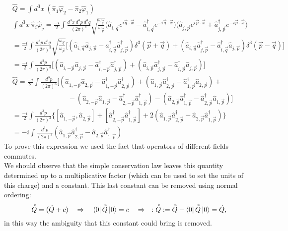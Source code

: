 \begin{align*}
   &\hat Q=\int d^3x\ (\hat\pi_1\hat\varphi_2-\hat\pi_2\hat\varphi_1)\\
   &\int d^3x\ \hat\pi_i\hat\varphi_j=\frac{-i}{2}\int\frac{d^3x\ d^3p\ d^3q}{(2\pi)^6}\sqrt{\frac{\omega_{\vec{q}}}{\omega_{\vec{p}}}} \bigg(\hat{a}_{i,\vec{q}}e^{i\vec q\cdot \vec x}-\hat{a}_{i,\vec{q}}^\dagger e^{-i\vec q\cdot \vec x}\bigg)\bigg(\hat{a}_{j,\vec{p}}e^{i\vec p\cdot \vec x}+\hat{a}_{j,\vec{p}}^\dagger e^{-i\vec p\cdot \vec x}\bigg)\\&=\frac{-i}{2}\int\frac{d^3p\ d^3q}{(2\pi)^3}\sqrt{\frac{\omega_{\vec{q}}}{\omega_{\vec{p}}}}\bigg[(\hat{a}_{i,\vec{q}}\hat{a}_{j,\vec{p}}-\hat{a}_{i,\vec{q}}^\dagger\hat{a}_{j,\vec{p}}^\dagger)\delta^3(\vec p+\vec q)+(\hat{a}_{i,\vec{q}}\hat{a}_{j,\vec{p}}^\dagger-\hat{a}_{i,\vec{q}}^\dagger\hat{a}_{j,\vec{p}}) \delta^3(\vec p-\vec q) \bigg]\\&=\frac{-i}{2}\int\frac{d^3p}{(2\pi)^3}\bigg[(\hat{a}_{i,-\vec{p}}\hat{a}_{j,\vec{p}}-\hat{a}_{i,-\vec{p}}^\dagger\hat{a}_{j,\vec{p}}^\dagger)+(\hat{a}_{i,\vec{p}}\hat{a}_{j,\vec{p}}^\dagger-\hat{a}_{i,\vec{p}}^\dagger\hat{a}_{j,\vec{p}})  \bigg]\\
   &\hat{Q}=\frac{-i}{2}\int\frac{d^3p}{(2\pi)^3}\bigg[(\hat{a}_{1,-\vec{p}}\hat{a}_{2,\vec{p}}-\hat{a}_{1,-\vec{p}}^\dagger\hat{a}_{2,\vec{p}}^\dagger)+(\hat{a}_{1,\vec{p}}\hat{a}_{2,\vec{p}}^\dagger-\hat{a}_{1,\vec{p}}^\dagger\hat{a}_{2,\vec{p}})+\\&\qquad\qquad\qquad\qquad-(\hat{a}_{2,-\vec{p}}\hat{a}_{1,\vec{p}}-\hat{a}_{2,-\vec{p}}^\dagger\hat{a}_{1,\vec{p}}^\dagger)-(\hat{a}_{2,\vec{p}}\hat{a}_{1,\vec{p}}^\dagger-\hat{a}_{2,\vec{p}}^\dagger\hat{a}_{1,\vec{p}})  \bigg]\\
   &=\frac{-i}{2}\int\frac{d^3p}{(2\pi)^3}\bigg\{[\hat{a}_{1,-\vec{p}},\hat{a}_{2,\vec{p}}]+[\hat{a}_{2,-\vec{p}}^\dagger\hat{a}_{1,\vec{p}}^\dagger]+2(\hat{a}_{1,\vec p}\hat{a}_{2,\vec p}^\dagger-\hat{a}_{2,\vec p}\hat{a}_{1,\vec p}^\dagger)\bigg\}\\
   &=-i\int\frac{d^3p}{(2\pi)^3}(\hat{a}_{1,\vec p}\hat{a}_{2,\vec p}^\dagger-\hat{a}_{2,\vec p}\hat{a}_{1,\vec p}^\dagger)
\end{align*}
To prove this expression we used the fact that operators of different fields commutes.\\

We should observe that the simple conservation law leaves this quantity determined up to a multiplicative factor (which can be used to set the units of this charge) and a constant. This last constant can be removed using normal ordering:
\begin{equation*}
    \hat{\tilde{Q}}=(\hat Q +c)\quad\Rightarrow\quad \bra{0}\hat{\tilde{Q}}\ket{0}=c\quad\Rightarrow\quad :\hat{\tilde{Q}}:=\hat{\tilde{Q}}-\bra{0}\hat{\tilde{Q}}\ket{0}=\hat Q,
\end{equation*}
in this way the ambiguity that this constant could bring is removed.\\


